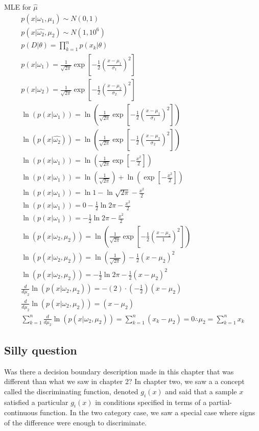 \documentclass[11pt]{article}
\begin{document}
MLE for $\hat{\mu}$ 
\begin{eqnarray}
	p( x | \omega_1, \mu_1 ) \sim N( 0, 1) \\
	p( x | \hat{\omega_2} , \mu_2) \sim N (1, 10^6) \\
	p( D | \theta)  = \prod _{k=1} ^n  p( x_k | \theta) \\
	p( x | \omega_1) = \frac{1}{\sqrt{2\pi}} \exp [ -\frac{1}{2} (\frac{x- \mu_1}{\sigma_1})^2] \\
	p( x | \omega_2) = \frac{1}{\sqrt{2\pi}} \exp [ -\frac{1}{2} (\frac{x- \mu_2}{\sigma_2})^2] \\
	\ln (p( x | \omega_1)) = \ln (\frac{1}{\sqrt{2\pi}} \exp [ -\frac{1}{2} (\frac{x- \mu_1}{\sigma_1})^2]) \\
	\ln (p( x | \hat{\omega_2})) = \ln (\frac{1}{\sqrt{2\pi}} \exp [ -\frac{1}{2} (\frac{x- \mu_2}{\sigma_2})^2]) \\
	\ln (p( x | \omega_1)) = \ln (\frac{1}{\sqrt{2\pi}} \exp [ -\frac{x^2}{2} ]) \\
	\ln (p( x | \omega_1)) = \ln (\frac{1}{\sqrt{2\pi}}) + \ln ( \exp [ -\frac{x^2}{2} ]) \\
	\ln (p( x | \omega_1)) = \ln 1 - \ln \sqrt{2\pi} - \frac{x^2}{2}  \\
	\ln (p( x | \omega_1)) = 0 - \frac{1}{2}\ln 2\pi - \frac{x^2}{2}  \\
	\ln (p( x | \omega_1)) =  -\frac{1}{2}\ln 2\pi - \frac{x^2}{2}  \\
	\ln (p( x | \omega_2, \mu_2)) = \ln (\frac{1}{\sqrt{2\pi}} \exp [ -\frac{1}{2} (\frac{x- \mu_2}{1})^2]) \\
	\ln (p( x | \omega_2, \mu_2)) = \ln (\frac{1}{\sqrt{2\pi}} )    -\frac{1}{2} (x- \mu_2)^2\\
	\ln (p( x | \omega_2, \mu_2)) =  -\frac{1}{2}\ln 2\pi    -\frac{1}{2} (x- \mu_2)^2\\
	\frac{d}{d\mu_2} \ln (p( x | \omega_2, \mu_2)) =   -(2) \cdot (-\frac{1}{2}) (x- \mu_2) \\
	\frac{d}{d\mu_2} \ln (p( x | \omega_2, \mu_2)) =   (x- \mu_2) \\
	\sum_{k=1} ^n \frac{d}{d\mu_2} \ln (p( x | \omega_2, \mu_2)) = \sum _{k=1}^n (x_k - \mu_2) = 0
	\therefore \mu_2 = \sum_{k=1}^n x_k 
\end{eqnarray}

\subsection{Silly question}
Was there a decision boundary description made in this chapter that was different than what we saw in chapter 2?   In chapter two, we saw a a concept called the discriminating function, denoted $g_i(x)$ and said that a sample $x$ satisfied a particular $g_i(x)$  in conditions specified in terms of a partial-continuous function.  In the two category case, we saw a special case where signs of the difference were enough to discriminate.   
\end{document}
